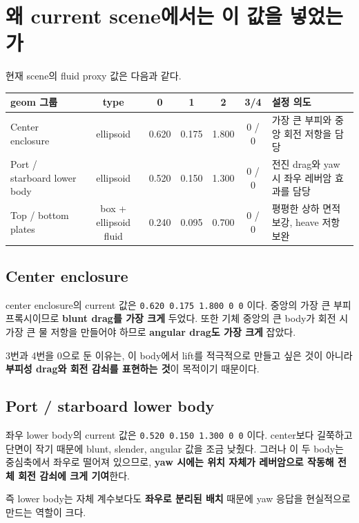 \documentclass[11pt,a4paper]{article}
\newcommand{\code}[1]{\nolinkurl{#1}}
\begin{document}
\section{왜 current scene에서는 이 값을 넣었는가}

현재 scene의 fluid proxy 값은 다음과 같다.

\begin{center}
\small
\begin{tabularx}{\linewidth}{@{}l c c c c c Y@{}}
\toprule
geom 그룹 & type & 0 & 1 & 2 & 3/4 & 설정 의도 \\
\midrule
Center enclosure & ellipsoid & 0.620 & 0.175 & 1.800 & 0 / 0 & 가장 큰 부피와 중앙 회전 저항을 담당 \\
Port / starboard lower body & ellipsoid & 0.520 & 0.150 & 1.300 & 0 / 0 & 전진 drag와 yaw 시 좌우 레버암 효과를 담당 \\
Top / bottom plates & box + ellipsoid fluid & 0.240 & 0.095 & 0.700 & 0 / 0 & 평평한 상하 면적 보강, heave 저항 보완 \\
\bottomrule
\end{tabularx}
\end{center}

\subsection{Center enclosure}

center enclosure의 current 값은 \code{0.620 0.175 1.800 0 0} 이다. 중앙의 가장 큰 부피 프록시이므로 \textbf{blunt drag를 가장 크게} 두었다. 또한 기체 중앙의 큰 body가 회전 시 가장 큰 물 저항을 만들어야 하므로 \textbf{angular drag도 가장 크게} 잡았다.

3번과 4번을 0으로 둔 이유는, 이 body에서 lift를 적극적으로 만들고 싶은 것이 아니라 \textbf{부피성 drag와 회전 감쇠를 표현하는 것}이 목적이기 때문이다.

\subsection{Port / starboard lower body}

좌우 lower body의 current 값은 \code{0.520 0.150 1.300 0 0} 이다. center보다 길쭉하고 단면이 작기 때문에 blunt, slender, angular 값을 조금 낮췄다. 그러나 이 두 body는 중심축에서 좌우로 떨어져 있으므로, \textbf{yaw 시에는 위치 자체가 레버암으로 작동해 전체 회전 감쇠에 크게 기여}한다.

즉 lower body는 자체 계수보다도 \textbf{좌우로 분리된 배치} 때문에 yaw 응답을 현실적으로 만드는 역할이 크다.
\end{document}
